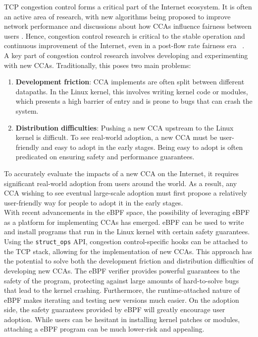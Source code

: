 \documentclass[../main.tex]{subfiles}
\begin{document}
TCP congestion control forms a critical part of the Internet ecosystem. It is often an active area of research, with new algorithms being proposed to improve network performance \cite{CCA-BBR, CCA-FCC} and discussions about how CCAs influence fairness between users \cite{CCAStarvation, CCA-Fairness}. Hence, congestion control research is critical to the stable operation and continuous improvement of the Internet, even in a post-flow rate fairness era ~\cite{PrinciplesForCongestionManagement, Dismantling}.\\
A key part of congestion control research involves developing and experimenting with new CCAs. Traditionally, this poses two main problems:
\begin{enumerate}
    \item {\bf Development friction}: CCA implements are often split between different datapaths. In the Linux kernel, this involves writing kernel code or modules, which presents a high barrier of entry and is prone to bugs that can crash the system.
    \item {\bf Distribution difficulties}: Pushing a new CCA upstream to the Linux kernel is difficult. To see real-world adoption, a new CCA must be user-friendly and easy to adopt in the early stages. Being easy to adopt is often predicated on ensuring safety and performance guarantees.
\end{enumerate}
To accurately evaluate the impacts of a new CCA on the Internet, it requires significant real-world adoption from users around the world. As a result, any CCA wishing to see eventual large-scale adoption must first propose a relatively user-friendly way for people to adopt it in the early stages. \\
With recent advancements in the eBPF space, the possibility of leveraging eBPF as a platform for implementing CCAs has emerged. eBPF \cite{ebpf} can be used to write and install programs that run in the Linux kernel with certain safety guarantees. Using the \texttt{struct\_ops} API, congestion control-specific hooks can be attached to the TCP stack, allowing for the implementation of new CCAs. This approach has the potential to solve both the development friction and distribution difficulties of developing new CCAs. The eBPF verifier provides powerful guarantees to the safety of the program, protecting against large amounts of hard-to-solve bugs that lead to the kernel crashing. Furthermore, the runtime-attached nature of eBPF makes iterating and testing new versions much easier. On the adoption side, the safety guarantees provided by eBPF will greatly encourage user adoption. While users can be hesitant in installing kernel patches or modules, attaching a eBPF program can be much lower-risk and appealing. \\
\end{document}
